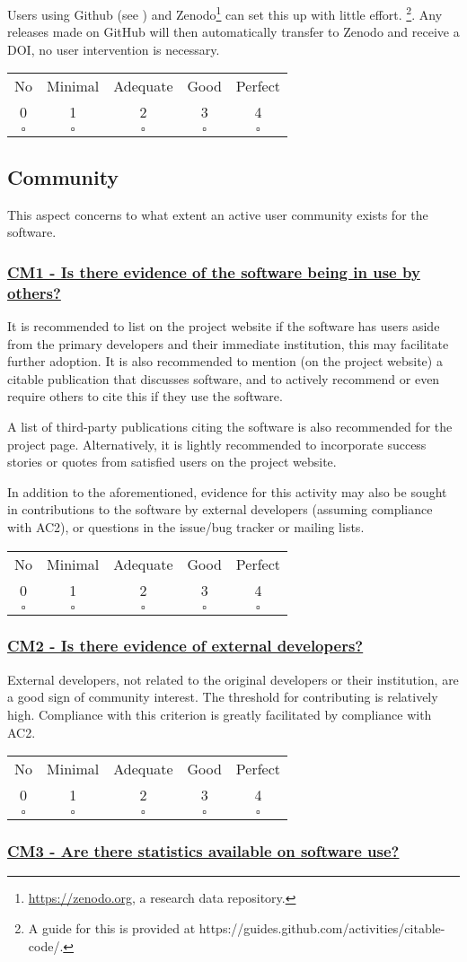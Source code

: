 \documentclass[a4paper,11pt]{article}
\newcommand{\criterion}[2]{\subsubsection*{\underline{#1 - #2}}\label{id:#1}}
\newcommand\CheckTable{%
  \begin{tabular}{ccccc}
    No & Minimal & Adequate & Good & Perfect \\
    0 & 1 & 2 & 3 & 4 \\
    \hline
    $\square$ & $\square$ & $\square$ & $\square$ & $\square$ \\
  \end{tabular}%
}
\newcommand{\refcrit}[1]{%
 \framebox[1.1\width]{\hyperref[id:#1]{#1}}
}
\begin{document}
Users using Github (see \refcrit{AC2}) and Zenodo\footnote{\url{https://zenodo.org}, a
research data repository.} can set this up with little effort. \footnote{A guide
for this is provided at https://guides.github.com/activities/citable-code/.}.
Any releases made on GitHub will then automatically transfer to Zenodo and
receive a DOI, no user intervention is necessary. 

\CheckTable

\subsection{Community}\label{sec:com}

This aspect concerns to what extent an active user community exists for the
software.

\newcommand{\cmOneID}{CM1}
\newcommand{\cmOneText}{Is there evidence of the software being in use by others?}
\criterion{\cmOneID}{\cmOneText}

It is recommended to list on the project website if the software has 
users aside from the primary developers and their immediate institution, this
may facilitate further adoption. It is also recommended to mention (on the
project website) a citable publication that discusses software, and to actively
recommend or even require others to cite this if they use the software.

A list of third-party publications citing the software is also recommended for
the project page. Alternatively, it is lightly recommended to
incorporate success stories or quotes from satisfied users on the project
website.

In addition to the aforementioned, evidence for this activity may also be sought
in contributions to the software by external developers (assuming
compliance with AC2), or questions in the issue/bug tracker or mailing lists.

\CheckTable

\newcommand{\cmTwoID}{CM2}
\newcommand{\cmTwoText}{Is there evidence of external developers?}
\criterion{\cmTwoID}{\cmTwoText}

External developers, not related to the original developers or their
institution, are a good sign of community interest. The threshold for
contributing is relatively high. Compliance with this criterion is greatly
facilitated by compliance with AC2.

\CheckTable

\newcommand{\cmThreeID}{CM3}
\newcommand{\cmThreeText}{Are there statistics available on software use?}
\criterion{\cmThreeID}{\cmThreeText}
\end{document}
